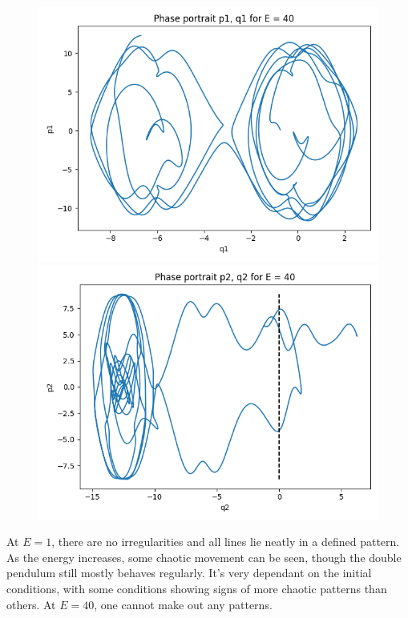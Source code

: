 \documentclass[a4paper,12pt]{article}
\begin{document}
\begin{figure}[!ht]
  \centering
  \begin{minipage}{0.45\textwidth}
    \includegraphics[width=\textwidth]{img/5-p1q1-40.png}
  \end{minipage}
  \begin{minipage}{0.45\textwidth}
    \includegraphics[width=\textwidth]{img/5-p2q2-40.png}
  \end{minipage}
\end{figure}

\FloatBarrier

At $E = 1$, there are no irregularities and all lines lie neatly in a defined pattern. As the energy increases,
some chaotic movement can be seen, though the double pendulum still mostly behaves regularly. It's very dependant
on the initial conditions, with some conditions showing signs of more chaotic patterns than others. At $E = 40$, one
cannot make out any patterns.
\end{document}
